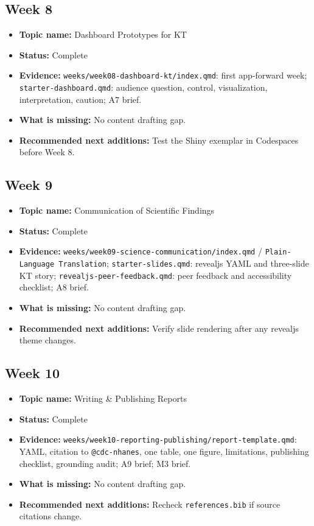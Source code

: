 \documentclass[
  letterpaper,
  DIV=11,
  numbers=noendperiod,
  oneside]{scrreprt}
\providecommand{\tightlist}{%
  \setlength{\itemsep}{0pt}\setlength{\parskip}{0pt}}
\begin{document}
\subsection{Week 8}\label{week-8}

\begin{itemize}
\tightlist
\item
  \textbf{Topic name:} Dashboard Prototypes for KT
\item
  \textbf{Status:} Complete
\item
  \textbf{Evidence:} \texttt{weeks/week08-dashboard-kt/index.qmd}: first
  app-forward week; \texttt{starter-dashboard.qmd}: audience question,
  control, visualization, interpretation, caution; A7 brief.
\item
  \textbf{What is missing:} No content drafting gap.
\item
  \textbf{Recommended next additions:} Test the Shiny exemplar in
  Codespaces before Week 8.
\end{itemize}

\subsection{Week 9}\label{week-9}

\begin{itemize}
\tightlist
\item
  \textbf{Topic name:} Communication of Scientific Findings
\item
  \textbf{Status:} Complete
\item
  \textbf{Evidence:}
  \texttt{weeks/week09-science-communication/index.qmd} /
  \texttt{Plain-Language\ Translation}; \texttt{starter-slides.qmd}:
  revealjs YAML and three-slide KT story;
  \texttt{revealjs-peer-feedback.qmd}: peer feedback and accessibility
  checklist; A8 brief.
\item
  \textbf{What is missing:} No content drafting gap.
\item
  \textbf{Recommended next additions:} Verify slide rendering after any
  revealjs theme changes.
\end{itemize}

\subsection{Week 10}\label{week-10}

\begin{itemize}
\tightlist
\item
  \textbf{Topic name:} Writing \& Publishing Reports
\item
  \textbf{Status:} Complete
\item
  \textbf{Evidence:}
  \texttt{weeks/week10-reporting-publishing/report-template.qmd}: YAML,
  citation to \texttt{@cdc-nhanes}, one table, one figure, limitations,
  publishing checklist, grounding audit; A9 brief; M3 brief.
\item
  \textbf{What is missing:} No content drafting gap.
\item
  \textbf{Recommended next additions:} Recheck \texttt{references.bib}
  if source citations change.
\end{itemize}
\end{document}
